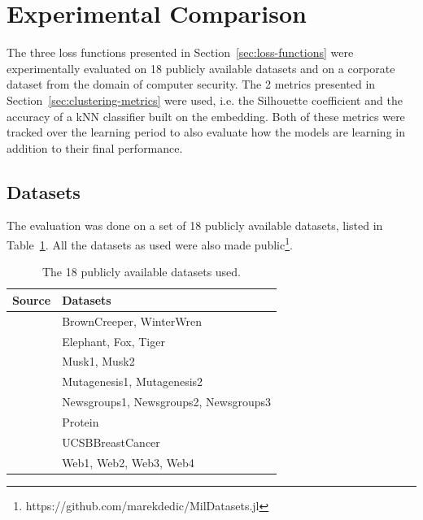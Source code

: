 \section{Experimental Comparison}\label{sec:experimental-comparison}

The three loss functions presented in Section~\ref{sec:loss-functions} were experimentally evaluated on 18 publicly available datasets and on a corporate dataset from the domain of computer security. The 2 metrics presented in Section~\ref{sec:clustering-metrics} were used, i.e. the Silhouette coefficient and the accuracy of a kNN classifier built on the embedding. Both of these metrics were tracked over the learning period to also evaluate how the models are learning in addition to their final performance.

\subsection{Datasets}

The evaluation was done on a set of 18 publicly available datasets, listed in Table~\ref{tab:datasets}. All the datasets as used were also made public\footnote{https://github.com/marekdedic/MilDatasets.jl}.

\begin{table}
  \centering
  \begin{tabular}{ll}
    \toprule
    Source & Datasets \\
    \midrule
    \cite{briggs_rank-loss_2012} & BrownCreeper, WinterWren \\
    \cite{andrews_support_2002} & Elephant, Fox, Tiger \\
    \cite{dietterich_solving_1997} & Musk1, Musk2 \\
    \cite{srinivasan_comparing_1995} & Mutagenesis1, Mutagenesis2 \\
    \cite{zhou_multi-instance_2008} & Newsgroups1, Newsgroups2, Newsgroups3 \\
    \cite{ray_learning_2005, ray_supervised_2005} & Protein \\
    \cite{kandemir_empowering_2014} & UCSBBreastCancer \\
    \cite{zhou_multi-instance_2005} & Web1, Web2, Web3, Web4 \\
    \bottomrule
  \end{tabular}
  \caption{The 18 publicly available datasets used.}\label{tab:datasets}
\end{table}

